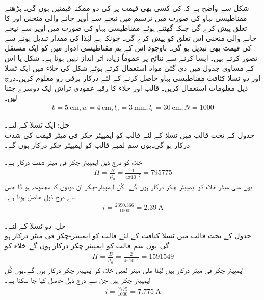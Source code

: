 شکل  سے واضح ہے کہ  کی کسی بھی قیمت پر  کی  دو ممکنہ قیمتیں ہوں گی۔ بڑھتے مقناطیسی بہاو کی صورت میں ترسیم میں نیچے سے اُوپر جانے والی منحنی  اور  کا تعلق پیش کرے گی جبکہ گھٹتے ہوئے مقناطیسی بہاو کی صورت میں  اوپر سے نیچے جانے والی منحنی اس تعلق کو پیش کرے  گی۔  چونکہ  ہے  لہٰذا  کی  مقدار تبدیل ہونے سے  کی قیمت  بھی تبدیل ہو گی۔ باوجود اس کے ہم مقناطیسی ادوار میں   کو ایک مستقل تصور کرتے ہیں۔ ایسا کرنے سے نتائج پر عموماً زیادہ اثر انداز نہیں ہوتا ہے۔
%
شکل   یا اس کے مساوی جدول  میں دی گئی مواد  استعمال کرتے ہوئے شکل   کی خلاء میں ایک ٹسلا اور دو ٹسلا کثافت  مقناطیسی بہاو حاصل کرنے کے لئے درکار برقی رو معلوم کریں۔درج ذیل معلومات استعمال کریں۔ قالب اور خلاء کا رقبہ عمودی تراش ایک دوسرے جتنا لیں۔
\begin{align*}
b=\SI{5}{\centi\meter},w=\SI{4}{\centi\meter},l_a=\SI{3}{\milli\meter},l_c=\SI{30}{\centi\meter},N=1000
\end{align*}


حل:\quad
 ایک ٹسلا کے لئے۔\\
 جدول  کے تحت قالب میں  ٹسلا  کے لئے  قالب کو   ایمپیئر-چکر فی  میٹر قیمت کی شدت   درکار ہو گی۔یوں  سم لمبے قالب کو   ایمپیئر چکر درکار ہوں گے۔

خلاء کو درج ذیل ایمپیئر-چکر فی میٹر شدت درکار ہے۔
\begin{align*}
H=\frac{B}{\mu_0}=\frac{1}{4\pi 10^{-7}}=\num{795775}
\end{align*}
یوں  ملی میٹر  خلاء کو  ایمپیئر چکر درکار ہوں گے۔ کُل ایمپیئر-چکر ان دونوں کا مجموعہ  ہو گا جس سے  درج ذیل حاصل ہوتا ہے۔
\begin{align*}
i=\frac{2390.366}{1000}=\SI{2.39}{\ampere}
\end{align*}	

حل: دو ٹسلا کے لئے۔\\
جدول  کے تحت قالب میں  ٹسلا  کثافت کے لئے  قالب کو  ایمپیئر-چکر فی میٹر  درکار ہو گی۔یوں  سم  قالب کو  ایمپیئر چکر درکار ہوں گے۔خلاء کو
\begin{align*}
H=\frac{B}{\mu_0}=\frac{2}{4\pi 10^{-7}}=\num{1591549}
\end{align*}
ایمپیئر-چکر فی میٹر درکار ہیں لہٰذا  ملی میٹر لمبی خلاء کو    ایمپیئر چکر درکار ہوں گے۔یوں کُل ایمپیئر-چکر  ہیں جن سے  درج ذیل حاصل کیا جا سکتا ہے۔
\begin{align*}
i=\frac{7775}{1000}=\SI{7.775}{\ampere}
\end{align*}

